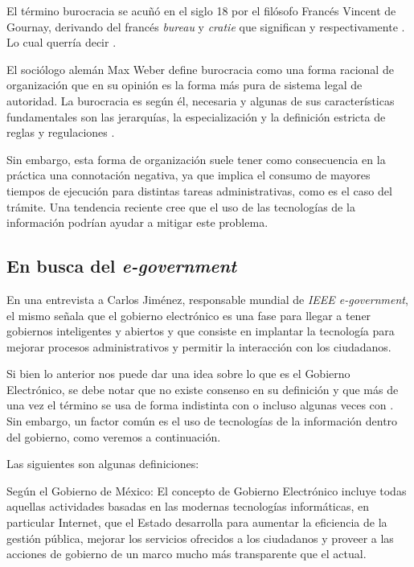 El término burocracia se acuñó en el siglo 18 por el filósofo Francés Vincent de
Gournay, derivando del francés \textit{bureau} y \textit{cratie} que significan
 y  respectivamente
\cite{rockmanBureaucracyStructureProcesses2024}. Lo cual querría decir .

El sociólogo alemán Max Weber define burocracia como una forma racional de
organización que en su opinión es la forma más pura de sistema legal de
autoridad. La burocracia es según él, necesaria y algunas de sus características
fundamentales son las jerarquías, la especialización y la definición estricta
de reglas y regulaciones \cite{archerDictionaryPublicAdministration2022}.

Sin embargo, esta forma de organización suele tener como consecuencia en la
práctica una connotación negativa, ya que implica el consumo de mayores tiempos
de ejecución para distintas tareas administrativas, como es el caso del trámite.
Una tendencia reciente cree que el uso de las tecnologías de la información
podrían ayudar a mitigar este problema.

\subsection{En busca del \textit{e-government}}

En una entrevista a Carlos Jiménez, responsable mundial de \textit{IEEE e-government}, el mismo señala que el gobierno electrónico es una fase para llegar a tener gobiernos inteligentes y abiertos y que consiste en implantar la tecnología para mejorar procesos administrativos y permitir la interacción con los ciudadanos.

Si bien lo anterior nos puede dar una idea sobre lo que es el Gobierno Electrónico, se debe notar que no existe consenso en su definición y que más de una vez el término se usa de forma indistinta con  o incluso algunas veces con . Sin embargo, un factor común es el uso de tecnologías de la información dentro del gobierno, como veremos a continuación.

Las siguientes son algunas definiciones:

Según el Gobierno de México: El concepto de Gobierno Electrónico incluye todas aquellas actividades basadas en las modernas tecnologías informáticas, en particular Internet, que el Estado desarrolla para aumentar la eficiencia de la gestión pública, mejorar los servicios ofrecidos a los ciudadanos y proveer a las acciones de gobierno de un marco mucho más transparente que el actual.

